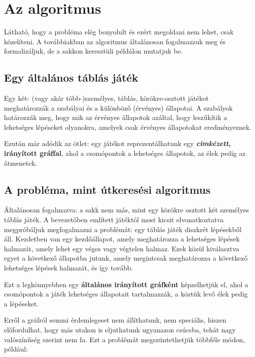 \documentclass[twoside, a4paper, 12pt]{article}
\begin{document}
\section{Az algoritmus}
Látható, hogy a probléma elég bonyolult és ezért megoldani nem lehet, csak közelíteni. A továbbiakban az algoritmus általánosan fogalmazzuk meg és formalizáljuk, de a sakkon keresztüli példálon mutatjuk be.

\subsection{Egy általános táblás játék}
Egy két- (vagy akár több-)személyes, táblás, körökre-osztott játékot meghatározzák a szabályai és a különböző (érvényes) állapotai. A szabályok határozzák meg, hogy mik az érvényes állapotok azáltal, hogy leszűkítik a lehetséges lépéseket olyanokra, amelyek csak érvényes állapotokat eredményeznek.

Ezután már adódik az ötlet: egy játékot reprezentálhatunk egy \textbf{\textit{cimkézett}, irányított gráffal}, ahol a csomópontok a lehetséges állapotok, az élek pedig az átmenetek.

\subsection{A probléma, mint útkeresési algoritmus}
Általánosan fogalmazva: a sakk nem más, mint egy körökre osztott két személyes táblás játék. A bevezetőben említett játéktól most kicsit elvonatkoztatva megpróbáljuk megfogalmazni a problémát: egy táblás játék diszkrét lépésekből áll. Kezdetben van egy kezdőállapot, amely meghatározza a lehetséges lépések halmazát, amely lehet egy véges vagy végtelen halmaz. Ezek közül kiválasztva egyet a következő állapotba jutunk, amely megintcsak meghatározza a következő lehetséges lépések halmazát, és így tovább. 

Ezt a legkönnyebben egy \textbf{általános irányított gráfként} képzelhetjük el, ahol a csomópontok a játék lehetséges állapotait tartalmazzák, a köztük levő élek pedig a lépéseket.

Erről a gráfról semmi érdemlegeset nem állíthatunk, nem speciális, hiszen előfordulhat, hogy más utakon is eljuthatunk ugyanazon csúcsba, tehát nagy valószínűség szerint nem fa. Ezt a problémát megszüntethetjük többféle módon, például: 
\end{document}

